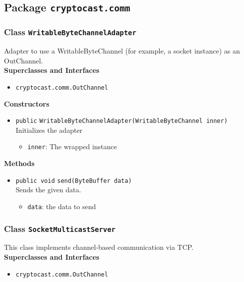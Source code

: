 \subsection{Package \lstinline!cryptocast.comm!}
\subsubsection{Class \lstinline|WritableByteChannelAdapter|}
Adapter to use a WritableByteChannel (for example, a socket instance) as an OutChannel. \\


\textbf{Superclasses and Interfaces}
\begin{itemize}
\item \lstinline|cryptocast.comm.OutChannel|
\end{itemize}



\textbf{Constructors}
\begin{itemize}
\item \lstinline|public| \lstinline|WritableByteChannelAdapter|\lstinline|(WritableByteChannel inner)|\\
Initializes the adapter
\begin{itemize}
\item \lstinline|inner|: The wrapped instance
\end{itemize}



\end{itemize}


\textbf{Methods}
\begin{itemize}
\item \lstinline|public void| \lstinline|send|\lstinline|(ByteBuffer data)|\\
Sends the given data.
\begin{itemize}
\item \lstinline|data|: the data to send
\end{itemize}



\end{itemize}

\subsubsection{Class \lstinline|SocketMulticastServer|}
This class implements channel-based communication via TCP. \\


\textbf{Superclasses and Interfaces}
\begin{itemize}
\item \lstinline|cryptocast.comm.OutChannel|
\end{itemize}



